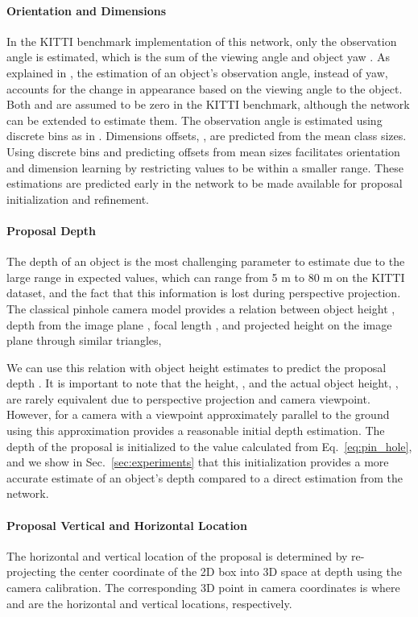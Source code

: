 \documentclass[10pt,twocolumn,letterpaper]{article}
\begin{document}
	\paragraph{Orientation and Dimensions}
	In the KITTI benchmark implementation of this network, only the observation angle  is estimated, which is the sum of the viewing angle  and object yaw . As explained in \cite{mousavian_deep3dbox}, the estimation of an object's observation angle, instead of yaw, accounts for the change in appearance based on the viewing angle to the object. Both  and  are assumed to be zero in the KITTI benchmark, although the network can be extended to estimate them. The observation angle is estimated using discrete bins as in \cite{qi_fpointnet}. Dimensions offsets, , are predicted from the mean class sizes. Using discrete bins and predicting offsets from mean sizes facilitates orientation and dimension learning by restricting values to be within a smaller range. These estimations are predicted early in the network to be made available for proposal initialization and refinement.
	
	\paragraph{Proposal Depth} The depth of an object is the most challenging parameter to estimate due to the large range in expected values, which can range from 5 m to 80 m on the KITTI dataset, and the fact that this information is lost during perspective projection. The classical pinhole camera model provides a relation between object height , depth from the image plane , focal length , and projected height on the image plane  through similar triangles,
	
	
We can use this relation with object height estimates to predict the proposal depth . It is important to note that the height, , and the actual object height, , are rarely equivalent due to perspective projection and camera viewpoint. However, for a camera with a viewpoint approximately parallel to the ground using this approximation provides a reasonable initial depth estimation. The depth of the proposal is initialized to the value calculated from Eq.~\ref{eq:pin_hole}, and we show in Sec.~\ref{sec:experiments} that this initialization provides a more accurate estimate of an object's depth compared to a direct estimation from the network.
	
	\paragraph{Proposal Vertical and Horizontal Location}
	The horizontal and vertical location  of the proposal is determined by re-projecting the center coordinate of the 2D box  into 3D space at depth  using the camera calibration. The corresponding 3D point in camera coordinates is  where  and  are the horizontal and vertical locations, respectively.
	
\end{document}
